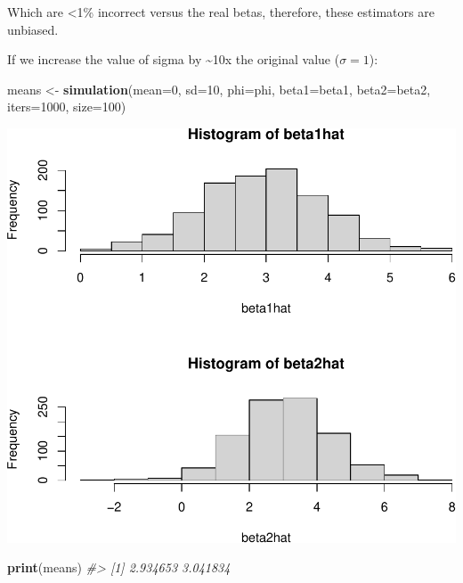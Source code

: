 \documentclass[]{article}
\newenvironment{Shaded}{\begin{snugshade}}{\end{snugshade}}
\newcommand{\CommentTok}[1]{\textcolor[rgb]{0.56,0.35,0.01}{\textit{#1}}}
\newcommand{\DataTypeTok}[1]{\textcolor[rgb]{0.13,0.29,0.53}{#1}}
\newcommand{\DecValTok}[1]{\textcolor[rgb]{0.00,0.00,0.81}{#1}}
\newcommand{\KeywordTok}[1]{\textcolor[rgb]{0.13,0.29,0.53}{\textbf{#1}}}
\newcommand{\NormalTok}[1]{#1}
\newcommand{\StringTok}[1]{\textcolor[rgb]{0.31,0.60,0.02}{#1}}
\begin{document}
Which are \textless{}1\% incorrect versus the real betas, therefore,
these estimators are unbiased.

\newpage

If we increase the value of sigma by \textasciitilde{}10x the original
value (\(\sigma = 1\)):

\begin{Shaded}
\begin{Highlighting}[]
\NormalTok{means <-}\StringTok{ }\KeywordTok{simulation}\NormalTok{(}\DataTypeTok{mean=}\DecValTok{0}\NormalTok{, }\DataTypeTok{sd=}\DecValTok{10}\NormalTok{, }\DataTypeTok{phi=}\NormalTok{phi, }\DataTypeTok{beta1=}\NormalTok{beta1, }\DataTypeTok{beta2=}\NormalTok{beta2, }\DataTypeTok{iters=}\DecValTok{1000}\NormalTok{, }\DataTypeTok{size=}\DecValTok{100}\NormalTok{)}
\end{Highlighting}
\end{Shaded}

\includegraphics{./figures/unnamed-chunk-7-1.pdf}

\begin{Shaded}
\begin{Highlighting}[]
\KeywordTok{print}\NormalTok{(means)}
\CommentTok{#> [1] 2.934653 3.041834}
\end{Highlighting}
\end{Shaded}
\end{document}
